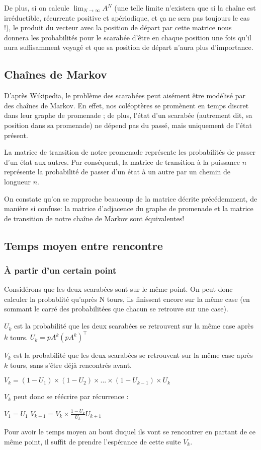 \documentclass{scrartcl} \usepackage[utf8]{inputenc}
\begin{document}
  De plus, si on calcule $\lim_{N \to \infty} A^N$ (une telle limite
n'existera que si la chaîne est irréductible, récurrente positive et
apériodique, et ça ne sera pas toujours le cas !), le produit du
vecteur avec la position de départ par cette matrice nous donnera les
probabilités pour le scarabée d'être en chaque position une fois qu'il
aura suffisamment voyagé et que sa position de départ n'aura plus
d'importance.

  \subsection{Chaînes de Markov}

  D'après Wikipedia, le problème des scarabées peut aisément être
modélisé par des chaînes de Markov. En effet, nos coléoptères se
promènent en temps discret dans leur graphe de promenade ; de plus,
l'état d'un scarabée (autrement dit, sa position dans sa promenade) ne
dépend pas du passé, mais uniquement de l'état présent.

  La matrice de transition de notre promenade représente les
probabilités de passer d'un état aux autres. Par conséquent, la
matrice de transition à la puissance $n$ représente la probabilité de
passer d'un état à un autre par un chemin de longueur $n$.

  On constate qu'on se rapproche beaucoup de la matrice décrite
précédemment, de manière si confuse: la matrice d'adjacence du graphe
de promenade et la matrice de transition de notre chaîne de Markov
sont équivalentes!

\subsection{Temps moyen entre rencontre}

\subsubsection{À partir d'un certain point}

Considérons que les deux scarabées sont sur le même point.  On peut
donc calculer la probablité qu'après N tours, ils finissent encore sur
la même case (en sommant le carré des probabilitées que chacun se
retrouve sur une case).

$U_k$ est la probabilité que les deux scarabées se retrouvent sur la
même case après $k$ tours.  $U_k = pA^k(pA^k)^\intercal$

$V_k$ est la probabilité que les deux scarabées se retrouvent sur la
même case après $k$ tours, sans s'être déjà rencontrés avant.

$V_k = (1 - U_1) \times (1 - U_2) \times ... \times (1 - U_{k - 1})
\times U_k$

$V_k$ peut donc se réécrire par récurrence :

$V_1 = U_1$ $V_{k + 1} = V_k \times \frac{1 - U_k}{U_k}U_{k + 1}$

Pour avoir le temps moyen au bout duquel ils vont se rencontrer en
partant de ce même point, il suffit de prendre l'espérance de cette
suite $V_k$.
\end{document}
